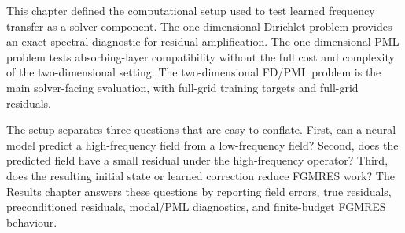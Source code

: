 This chapter defined the computational setup used to test learned frequency
transfer as a solver component. The one-dimensional Dirichlet problem provides
an exact spectral diagnostic for residual amplification. The one-dimensional
PML problem tests absorbing-layer compatibility without the full cost and
complexity of the two-dimensional setting. The two-dimensional FD/PML problem
is the main solver-facing evaluation, with full-grid training targets and
full-grid residuals.

The setup separates three questions that are easy to conflate. First, can a
neural model predict a high-frequency field from a low-frequency field?
Second, does the predicted field have a small residual under the
high-frequency operator? Third, does the resulting initial state or learned
correction reduce FGMRES work? The Results chapter answers these questions by
reporting field errors, true residuals, preconditioned residuals, modal/PML
diagnostics, and finite-budget FGMRES behaviour.

%
%
%
%
